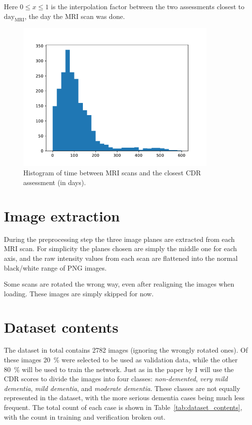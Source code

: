 \documentclass{kththesis}
\begin{document}
Here $0 \leq x \leq 1$ is the interpolation factor between the two assessments closest to $\text{day}_{\text{MRI}}$, the day the MRI scan was done.

\begin{figure}
  \begin{center}
    \includegraphics[width=100mm]{img/mri_cdr_offset.pdf}
    \caption{Histogram of time between MRI scans and the closest CDR assessment (in days).}
    \label{fig:mri_cdr_offset}
  \end{center}
\end{figure}

\section{Image extraction}
During the preprocessing step the three image planes are extracted from each MRI scan. For simplicity the planes chosen are simply the middle one for each axis, and the raw intensity values from each scan are flattened into the normal black/white range of PNG images.

Some scans are rotated the wrong way, even after realigning the images when loading. These images are simply skipped for now.

\section{Dataset contents}
The dataset in total contains 2782 images (ignoring the wrongly rotated ones). Of these images 20~\% were selected to be used as validation data, while the other 80~\% will be used to train the network. Just as in the paper by \textcite{islam2018early} I will use the CDR scores to divide the images into four classes: \textit{non-demented}, \textit{very mild dementia}, \textit{mild dementia}, and \textit{moderate dementia}. These classes are not equally represented in the dataset, with the more serious dementia cases being much less frequent. The total count of each case is shown in Table~\ref{tab:dataset_contents}, with the count in training and verification broken out.
\end{document}

